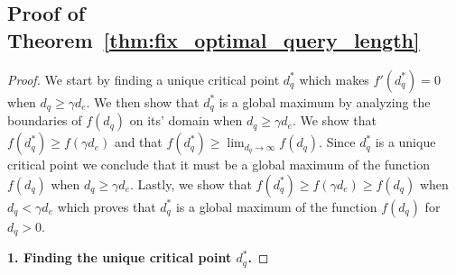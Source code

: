 \subsection{Proof of Theorem~\ref{thm:fix_optimal_query_length}}
\label{app:thm2}

\begin{proof}
We start by finding a unique critical point $d^*_q$ which makes $f'(d^*_q) = 0$ when $d_q \ge \gamma d_e$. We then show that $d_q^*$ is a global maximum by analyzing the boundaries of $f(d_q)$ on its' domain when $d_q \ge \gamma d_e$. We show that $f(d_q^*) \ge f(\gamma d_e)$ and that $f(d_q^*) \ge \lim_{d_q \rightarrow \infty} f(d_q)$. Since $d_q^*$ is a unique critical point we conclude that it must be a global maximum of the function $f(d_q)$ when $d_q \ge \gamma d_e$. Lastly, we show that $f(d_q^*) \ge f(\gamma d_e) \ge f(d_q)$ when $d_q < \gamma d_e$ which proves that $d_q^*$ is a global maximum of the function $f(d_q)$ for $d_q > 0$.

\textbf{1. Finding the unique critical point $d_q^*$.}


\end{proof}

